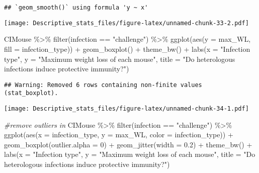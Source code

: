 \documentclass[
]{article}
\newenvironment{Shaded}{\begin{snugshade}}{\end{snugshade}}
\newcommand{\AttributeTok}[1]{\textcolor[rgb]{0.77,0.63,0.00}{#1}}
\newcommand{\CommentTok}[1]{\textcolor[rgb]{0.56,0.35,0.01}{\textit{#1}}}
\newcommand{\DecValTok}[1]{\textcolor[rgb]{0.00,0.00,0.81}{#1}}
\newcommand{\FloatTok}[1]{\textcolor[rgb]{0.00,0.00,0.81}{#1}}
\newcommand{\FunctionTok}[1]{\textcolor[rgb]{0.00,0.00,0.00}{#1}}
\newcommand{\NormalTok}[1]{#1}
\newcommand{\SpecialCharTok}[1]{\textcolor[rgb]{0.00,0.00,0.00}{#1}}
\newcommand{\StringTok}[1]{\textcolor[rgb]{0.31,0.60,0.02}{#1}}
\begin{document}
\begin{verbatim}
## `geom_smooth()` using formula 'y ~ x'
\end{verbatim}

\texttt{[image: Descriptive\_stats\_files/figure-latex/unnamed-chunk-33-2.pdf]}

\begin{Shaded}
\begin{Highlighting}[]
\NormalTok{CIMouse  }\SpecialCharTok{\%\textgreater{}\%}
    \FunctionTok{filter}\NormalTok{(infection }\SpecialCharTok{==} \StringTok{"challenge"}\NormalTok{)  }\SpecialCharTok{\%\textgreater{}\%}
  \FunctionTok{ggplot}\NormalTok{(}\FunctionTok{aes}\NormalTok{(}\AttributeTok{y =}\NormalTok{ max\_WL, }\AttributeTok{fill =}\NormalTok{ infection\_type)) }\SpecialCharTok{+}
  \FunctionTok{geom\_boxplot}\NormalTok{() }\SpecialCharTok{+}
    \FunctionTok{theme\_bw}\NormalTok{() }\SpecialCharTok{+}
    \FunctionTok{labs}\NormalTok{(}\AttributeTok{x =} \StringTok{"Infection type"}\NormalTok{, }\AttributeTok{y =} \StringTok{"Maximum weight loss of each mouse"}\NormalTok{,}
       \AttributeTok{title =} \StringTok{"Do heterologous infections induce protective immunity?"}\NormalTok{)}
\end{Highlighting}
\end{Shaded}

\begin{verbatim}
## Warning: Removed 6 rows containing non-finite values (stat_boxplot).
\end{verbatim}

\texttt{[image: Descriptive\_stats\_files/figure-latex/unnamed-chunk-34-1.pdf]}

\begin{Shaded}
\begin{Highlighting}[]
\CommentTok{\#remove outliers in}
\NormalTok{CIMouse  }\SpecialCharTok{\%\textgreater{}\%}
    \FunctionTok{filter}\NormalTok{(infection }\SpecialCharTok{==} \StringTok{"challenge"}\NormalTok{)  }\SpecialCharTok{\%\textgreater{}\%}
  \FunctionTok{ggplot}\NormalTok{(}\FunctionTok{aes}\NormalTok{(}\AttributeTok{x =}\NormalTok{ infection\_type, }\AttributeTok{y =}\NormalTok{ max\_WL, }\AttributeTok{color =}\NormalTok{ infection\_type)) }\SpecialCharTok{+}
  \FunctionTok{geom\_boxplot}\NormalTok{(}\AttributeTok{outlier.alpha =} \DecValTok{0}\NormalTok{) }\SpecialCharTok{+}
   \FunctionTok{geom\_jitter}\NormalTok{(}\AttributeTok{width =} \FloatTok{0.2}\NormalTok{) }\SpecialCharTok{+}
    \FunctionTok{theme\_bw}\NormalTok{() }\SpecialCharTok{+}
    \FunctionTok{labs}\NormalTok{(}\AttributeTok{x =} \StringTok{"Infection type"}\NormalTok{, }\AttributeTok{y =} \StringTok{"Maximum weight loss of each mouse"}\NormalTok{,}
       \AttributeTok{title =} \StringTok{"Do heterologous infections induce protective immunity?"}\NormalTok{)}
\end{Highlighting}
\end{Shaded}
\end{document}
